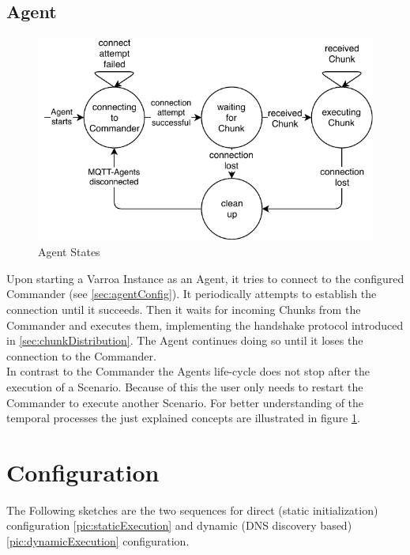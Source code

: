 \subsection{Agent}
\begin{figure}[H]
	\begin{center}
	\includegraphics[scale=0.9]{Resources/PDF/AgentStates}
	\caption{Agent States}
	\label{pic:AgentStates}
	\end{center}
\end{figure}
Upon starting a Varroa Instance as an Agent, it tries to connect to the configured Commander (see \ref{sec:agentConfig}).
It periodically attempts to establish the connection until it succeeds.
Then it waits for incoming Chunks from the Commander and executes them, implementing the handshake protocol introduced in \ref{sec:chunkDistribution}.
The Agent continues doing so until it loses the connection to the Commander.\\
In contrast to the Commander the Agents life-cycle does not stop after the execution of a Scenario.
Because of this the user only needs to restart the Commander to execute another Scenario.
For better understanding of the temporal processes the just explained concepts are illustrated in figure \ref{pic:AgentStates}.

\section{Configuration}
The Following sketches are the two sequences for direct (static initialization) configuration \ref{pic:staticExecution} and dynamic (DNS discovery based) \ref{pic:dynamicExecution} configuration.

